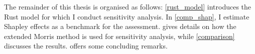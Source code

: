 




The remainder of this thesis is organised as follows: \cref{rust_model} introduces the Rust model for which I conduct sensitivity analysis. In \cref{comp_shap}, I estimate Shapley effects as a benchmark for the assessment.  gives details on how the extended Morris method is used for sensitivity analysis, while \cref{comparison} discusses the results.  offers some concluding remarks.
